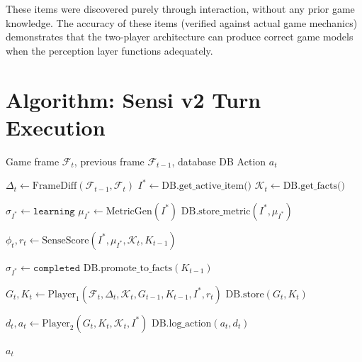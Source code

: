 \documentclass[11pt,letterpaper]{article}
\begin{document}
These items were discovered purely through interaction, without any prior game knowledge. The accuracy of these items (verified against actual game mechanics) demonstrates that the two-player architecture can produce correct game models when the perception layer functions adequately.

\section{Algorithm: Sensi v2 Turn Execution}
\label{app:algorithm}

\begin{algorithm}[H]
\caption{Sensi v2: Single Turn Execution}
\label{alg:turn}
\begin{algorithmic}[1]
\Require Game frame $\mathcal{F}_t$, previous frame $\mathcal{F}_{t-1}$, database DB
\Ensure Action $a_t$

\State $\Delta_t \gets \text{FrameDiff}(\mathcal{F}_{t-1}, \mathcal{F}_t)$ 
\State $I^* \gets \text{DB.get\_active\_item()}$ 
\State $\mathcal{K}_t \gets \text{DB.get\_facts()}$ 

    \State $\sigma_{I^*} \gets \texttt{learning}$
    \State $\mu_{I^*} \gets \text{MetricGen}(I^*)$ 
    \State $\text{DB.store\_metric}(I^*, \mu_{I^*})$
\EndIf

\State $\phi_t, r_t \gets \text{SenseScore}(I^*, \mu_{I^*}, \mathcal{K}_t, K_{t-1})$ 

    \State $\sigma_{I^*} \gets \texttt{completed}$
    \State $\text{DB.promote\_to\_facts}(K_{t-1})$ 
\EndIf

\State $G_t, K_t \gets \text{Player}_1(\mathcal{F}_t, \Delta_t, \mathcal{K}_t, G_{t-1}, K_{t-1}, I^*, r_t)$ 
\State $\text{DB.store}(G_t, K_t)$

\State $d_t, a_t \gets \text{Player}_2(G_t, K_t, \mathcal{K}_t, I^*)$ 
\State $\text{DB.log\_action}(a_t, d_t)$

\State \Return $a_t$
\end{algorithmic}
\end{algorithm}
\end{document}
